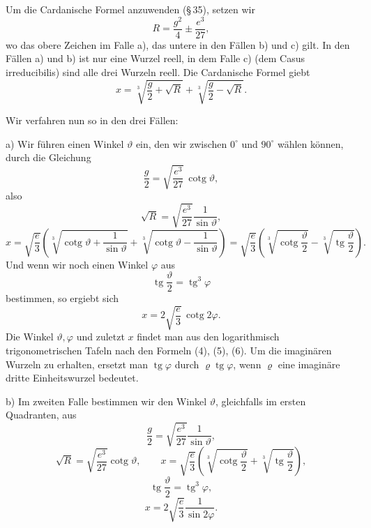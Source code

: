 \documentclass[11pt]{article}
\providecommand{\tg}{\operatorname{tg}}
\providecommand{\cotg}{\operatorname{cotg}}
\begin{document}
Um die Cardanische Formel anzuwenden (\S\,35), setzen wir
\begin{equation}
        R=\frac{g^2}{4}\pm\frac{e^3}{27},
\tag{2}
\end{equation}
wo das obere Zeichen im Falle a), das untere in den Fällen b) und c) gilt. In den Fällen a) und b) ist nur eine Wurzel reell, in dem Falle c) (dem Casus irreducibilis) sind alle drei Wurzeln reell. Die Cardanische Formel giebt
\begin{equation}
        x=\sqrt[3]{\frac g2+\sqrt R}
          +\sqrt[3]{\frac g2-\sqrt R}.
\tag{3}
\end{equation}

Wir verfahren nun so in den drei Fällen:

a) Wir führen einen Winkel $\vartheta$ ein, den wir zwischen $0^\circ$ und $90^\circ$ wählen können, durch die Gleichung
\begin{equation}
        \frac g2=\sqrt{\frac{e^3}{27}}\,\cotg\vartheta,
\tag{4}
\end{equation}
also
\[
        \sqrt R=\sqrt{\frac{e^3}{27}}\frac1{\sin\vartheta},
\]
\[
x=\sqrt{\frac e3}\left(\sqrt[3]{\cotg\vartheta+\frac1{\sin\vartheta}}
+\sqrt[3]{\cotg\vartheta-\frac1{\sin\vartheta}}\right)
=\sqrt{\frac e3}\left(\sqrt[3]{\cotg\frac\vartheta2}
-\sqrt[3]{\tg\frac\vartheta2}\right).
\]
Und wenn wir noch einen Winkel $\varphi$ aus
\begin{equation}
        \tg\frac{\vartheta}{2}=\tg^3\varphi
\tag{5}
\end{equation}
bestimmen, so ergiebt sich
\begin{equation}
        x=2\sqrt{\frac e3}\,\cotg 2\varphi.
\tag{6}
\end{equation}
Die Winkel $\vartheta,\varphi$ und zuletzt $x$ findet man aus den logarithmisch trigonometrischen Tafeln nach den Formeln (4), (5), (6). Um die imaginären Wurzeln zu erhalten, ersetzt man $\tg\varphi$ durch $\varrho\tg\varphi$, wenn $\varrho$ eine imaginäre dritte Einheitswurzel bedeutet.

b) Im zweiten Falle bestimmen wir den Winkel $\vartheta$, gleichfalls im ersten Quadranten, aus
\begin{equation}
        \frac g2=\sqrt{\frac{e^3}{27}}\frac1{\sin\vartheta},
\tag{7}
\end{equation}
\[
        \sqrt R=\sqrt{\frac{e^3}{27}}\cotg\vartheta,\qquad
        x=\sqrt{\frac e3}\left(
        \sqrt[3]{\cotg\frac{\vartheta}{2}}
        +\sqrt[3]{\tg\frac{\vartheta}{2}}\right),
\]
\begin{equation}
        \tg\frac{\vartheta}{2}=\tg^3\varphi,
\tag{8}
\end{equation}
\begin{equation}
        x=2\sqrt{\frac e3}\frac1{\sin 2\varphi}.
\tag{9}
\end{equation}
\end{document}
